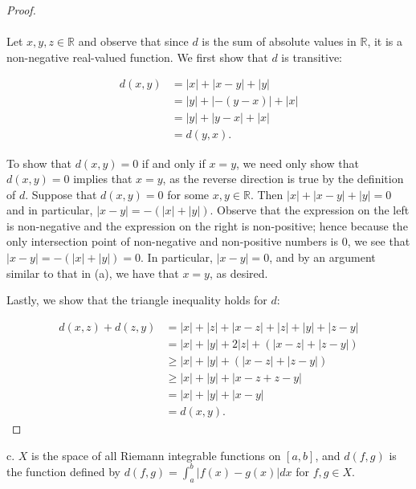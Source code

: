     \begin{proof}\ \\\\
        Let $x, y, z \in \mathbb{R}$ and observe that since $d$ is the sum of absolute values in $\mathbb{R}$, it is a
        non-negative real-valued function. We first show that $d$ is transitive:

        \begin{align*}
            d(x, y) &= |x| + |x - y| + |y| \\
                    &= |y| + |-(y - x)| + |x| \\
                    &= |y| + |y - x| + |x| \\
                    &= d(y, x).
        \end{align*}

        To show that $d(x, y) = 0$ if and only if $x = y$, we need only show that $d(x, y) = 0$ implies that
        $x = y$, as the reverse direction is true by the definition of $d$. Suppose that $d(x, y) = 0$ for 
        some $x, y \in \mathbb{R}$. Then $|x| + |x - y| + |y| = 0$ and in particular, $|x - y| = -(|x| + |y|)$.
        Observe that the expression on the left is non-negative and the expression on the right is
        non-positive; hence because the only intersection point of non-negative and non-positive numbers is 0, we
        see that $|x - y| = -(|x| + |y|) = 0$. In particular, $|x - y| = 0$, and by an argument similar to that
        in (a), we have that $x = y$, as desired.

        Lastly, we show that the triangle inequality holds for $d$:

        \begin{align*}
            d(x, z) + d(z, y) &= |x| + |z| + |x - z| + |z| + |y| + |z - y| \\
                              &= |x| + |y| + 2|z| + (|x - z| + |z - y|) \\
                              &\ge |x| + |y| + (|x - z| + |z - y|) \\
                              &\ge |x| + |y| + |x - z + z - y| \\
                              &= |x| + |y| + |x - y| \\
                              &= d(x, y).
        \end{align*}
    \end{proof}

    \pagebreak

c.  $X$ is the space of all Riemann integrable functions on $[a, b]$, and 
    $d(f, g)$ is the function defined by 
    $d(f, g) = \int_a^b{|f(x) - g(x)|dx}$ for $f, g \in X$. \ \\

